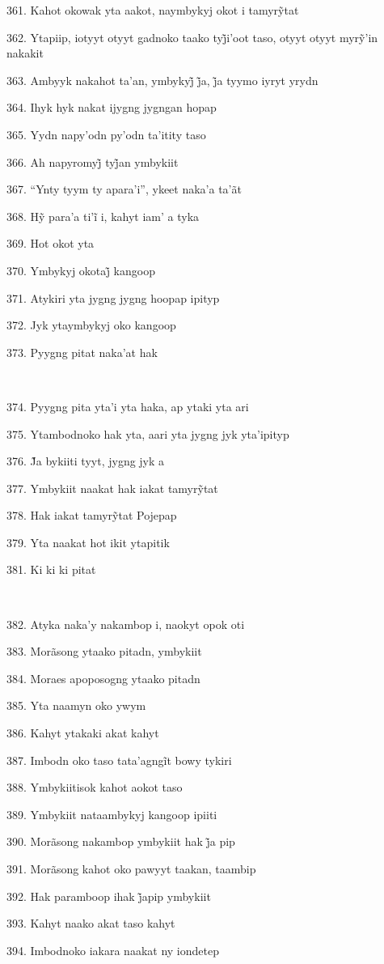 361. Kahot okowak yta aakot, naymbykyj okot i tamyrỹtat

362. Ytapiip, iotyyt otyyt gadnoko taako tyj̃i’oot taso, otyyt otyyt myrỹ’in nakakit

363. Ambyyk nakahot ta’an, ymbykyj̃ j̃a, j̃a tyymo iyryt yrydn

364. Ihyk hyk nakat ijygng jygngan hopap

365. Yydn napy'odn py'odn ta'itity taso

366. Ah napyromyj̃ tyj̃an ymbykiit

367. ``Ynty tyym ty apara'i'', ykeet naka'a ta'ãt

368. Hỹ para’a ti’ĩ i, kahyt iam’ a tyka

369. Hot okot yta

370. Ymbykyj okotaj̃ kangoop

371. Atykiri yta jygng jygng hoopap ipityp

372. Jyk ytaymbykyj oko kangoop

373. Pyygng pitat naka'at hak

~

374. Pyygng pita yta'i yta haka, ap ytaki yta ari

375. Ytambodnoko hak yta, aari yta jygng jyk yta'ipityp

376. J̃a bykiiti tyyt, jygng jyk a

377. Ymbykiit naakat hak iakat tamyrỹtat

378. Hak iakat tamyrỹtat Pojepap

379. Yta naakat hot ikit ytapitik

381. Ki ki ki pitat

~

382. Atyka naka'y nakambop i, naokyt opok oti

383. Morãsong ytaako pitadn, ymbykiit

384. Moraes apoposogng ytaako pitadn

385. Yta naamyn oko ywym

386. Kahyt ytakaki akat kahyt

387. Imbodn oko taso tata’agngĩt bowy tykiri

388. Ymbykiitisok kahot aokot taso

389. Ymbykiit nataambykyj kangoop ipiiti

390. Morãsong nakambop ymbykiit hak j̃a pip

391. Morãsong kahot oko pawyyt taakan, taambip

392. Hak paramboop ihak j̃apip ymbykiit

393. Kahyt naako akat taso kahyt

394. Imbodnoko iakara naakat ny iondetep